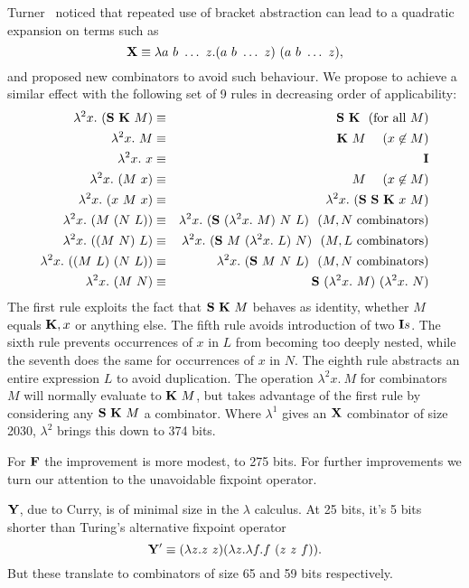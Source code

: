 \documentclass{article}
\newcommand{\baz}[1]{\lambda^0 #1.\ }
\newcommand{\bassz}[1]{\lambda^2 #1.\ }
\newcommand{\CS}{{\bf S}}
\newcommand{\CK}{{\bf K}}
\newcommand{\CX}{{\bf X}}
\newcommand{\CY}{{\bf Y}}
\newcommand{\CI}{{\bf I}}
\newcommand{\CF}{{\bf F}}
\begin{document}
Turner~\cite{t} noticed that repeated use of bracket abstraction
can lead to a quadratic expansion on terms such as
\[ \CX \equiv \lambda a\ b\ \ldots\ z.(a\ b\ \ldots\ z)\ (a\ b\ \ldots\ z), \]
and proposed new combinators to avoid such behaviour.
We propose to achieve a similar effect with the following
set of 9 rules in decreasing order of applicability:
\begin{eqnarray*}
\bassz{x}(\CS\ \CK\ M) & \equiv & \CS\ \CK\,\,\,\,(\mbox{for all $M$}) \\
\bassz{x}M & \equiv & \CK\ M \,\,\,\,\,\,\,\,(x \not\in M) \\
\bassz{x}x & \equiv & \CI \\
\bassz{x}(M\ x) & \equiv & M \,\,\,\,\,\,\,\,(x \not\in M) \\
\bassz{x}(x\ M\ x) & \equiv & \bassz{x}(\CS\ \CS\ \CK\ x\ M) \\
\bassz{x}(M\ (N\ L)) & \equiv & \bassz{x}(\CS\ (\bassz{x}M)\ N\ L)\,\,\,\,(\mbox{$M,N$ combinators}) \\
\bassz{x}((M\ N)\ L) & \equiv & \bassz{x}(\CS\ M\ (\bassz{x}L)\ N)\,\,\,\,(\mbox{$M,L$ combinators}) \\
\bassz{x}((M\ L)\ (N\ L)) & \equiv & \bassz{x}(\CS\ M\ N\ L)\,\,\,\,(\mbox{$M,N$ combinators}) \\
\bassz{x}(M\ N) & \equiv & \CS\ (\bassz{x}M)\ (\bassz{x}N)
\end{eqnarray*}
The first rule exploits the fact that $\CS\ \CK\ M$ behaves as identity,
whether $M$ equals $\CK,x$ or anything else.
The fifth rule avoids introduction of two $\CI s$.
The sixth rule prevents occurrences of $x$ in $L$ from becoming too
deeply nested, while the seventh does the same for occurrences of $x$ in $N$.
The eighth rule abstracts an entire expression $L$ to avoid duplication.
The operation $\bassz{x}M$ for combinators $M$
will normally evaluate to $\CK\ M$,
but takes advantage of the first rule by considering any $\CS\ \CK\ M$
a combinator.
Where $\lambda^1$ gives an $\CX$ combinator of size 2030, $\lambda^2$ brings
this down to 374 bits.

For $\CF$ the improvement is more modest, to 275 bits.
For further improvements we turn our attention to the unavoidable
fixpoint operator.

$\CY$, due to Curry, is of minimal size in the $\lambda$ calculus.
At 25 bits, it's 5 bits shorter than Turing's alternative fixpoint operator
\[ \CY' \equiv (\lambda z.z\ z)(\lambda z.\lambda f.f\ (z\ z\ f)). \]
But these translate to combinators of size 65 and 59 bits respectively.
\end{document}
